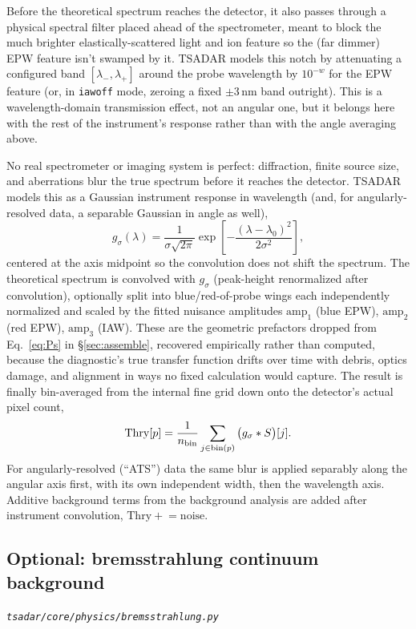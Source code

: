 \documentclass[11pt]{article}
\newcommand{\code}[1]{\texttt{#1}}
\newcommand{\file}[1]{\texttt{#1}}
\begin{document}
Before the theoretical spectrum reaches the detector, it also passes through a physical
spectral filter placed ahead of the spectrometer, meant to block the much brighter
elastically-scattered light and ion feature so the (far dimmer) EPW feature isn't swamped
by it. TSADAR models this notch by attenuating a configured band $[\lambda_-,\lambda_+]$
around the probe wavelength by $10^{-w}$ for the EPW feature (or, in \code{iawoff} mode,
zeroing a fixed $\pm3\,$nm band outright). This is a wavelength-domain transmission effect,
not an angular one, but it belongs here with the rest of the instrument's response rather
than with the angle averaging above.

No real spectrometer or imaging system is perfect: diffraction, finite source size,
and aberrations blur the true spectrum before it reaches the detector. TSADAR models this
as a Gaussian instrument response in wavelength (and, for angularly-resolved data, a
separable Gaussian in angle as well),
\begin{equation}
  g_\sigma(\lambda) = \frac{1}{\sigma\sqrt{2\pi}}\exp\!\left[-\frac{(\lambda-\lambda_0)^2}{2\sigma^2}\right],
\end{equation}
centered at the axis midpoint so the convolution does not shift the spectrum. The
theoretical spectrum is convolved with $g_\sigma$ (peak-height renormalized after
convolution), optionally split into blue/red-of-probe wings each independently normalized
and scaled by the fitted nuisance amplitudes $\mathrm{amp}_1$ (blue EPW), $\mathrm{amp}_2$
(red EPW), $\mathrm{amp}_3$ (IAW). These are the geometric prefactors dropped from
Eq.~\ref{eq:Ps} in \S\ref{sec:assemble}, recovered empirically rather than computed,
because the diagnostic's true transfer function drifts over time with debris, optics
damage, and alignment in ways no fixed calculation would capture. The result is finally
bin-averaged from the internal fine grid down onto the detector's actual pixel count,
\begin{equation}
  \mathrm{Thry}[p] = \frac{1}{n_{\rm bin}}\sum_{j\in\mathrm{bin}(p)}\big(g_\sigma*S\big)[j].
\end{equation}
For angularly-resolved (``ATS'') data the same blur is applied separably along the angular
axis first, with its own independent width, then the wavelength axis. Additive background terms from the background analysis are added after instrument convolution,
$\mathrm{Thry}\mathrel{+}=\mathrm{noise}$.

\subsection{Optional: bremsstrahlung continuum background}\label{sec:brem}
\textit{\file{tsadar/core/physics/bremsstrahlung.py}}
\end{document}
